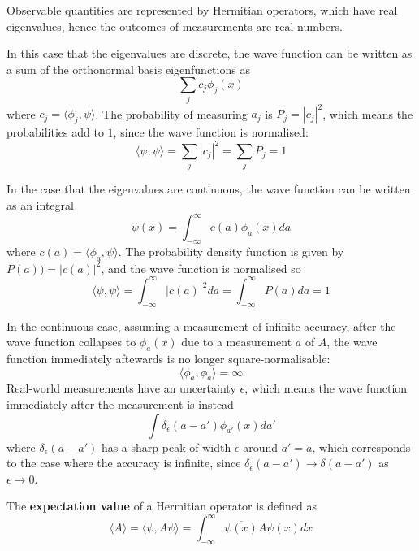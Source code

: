 \begin{corollary}
	Observable quantities are represented by Hermitian operators, which have real eigenvalues, hence the outcomes of measurements are real numbers.
\end{corollary}

\begin{remark}
	In this case that the eigenvalues are discrete, the wave function can be written as a sum of the orthonormal basis eigenfunctions as
	\[
		\sum_j c_j \phi_j(x)
	\]
	where $c_j = \langle \phi_j, \psi \rangle$. The probability of measuring $a_j$ is $P_j = |c_j|^2$, which means the probabilities add to $1$, since the wave function is normalised:
	\[
		\langle \psi, \psi \rangle = \sum_j |c_j|^2 = \sum_j P_j = 1
	\]
\end{remark}

\begin{remark}
	In the case that the eigenvalues are continuous, the wave function can be written as an integral
	\[
		\psi(x) = \int_{-\infty}^{\infty} c(a) \phi_a(x) da
	\]
	where $c(a) = \langle \phi_a, \psi \rangle$. The probability density function is given by $P(a)) = |c(a)|^2$, and the wave function is normalised so
	\[
		\langle \psi, \psi \rangle = \int_{-\infty}^{\infty} |c(a)|^2 da = \int_{-\infty}^{\infty} P(a) da = 1
	\]
\end{remark}

\begin{remark}
	In the continuous case, assuming a measurement of infinite accuracy, after the wave function collapses to $\phi_a(x)$ due to a measurement $a$ of $A$, the wave function immediately aftewards is no longer square-normalisable:
	\[
		\langle \phi_a, \phi_a \rangle = \infty
	\]
	Real-world measurements have an uncertainty $\epsilon$, which means the wave function immediately after the measurement is instead
	\[
		\int \delta_{\epsilon} (a - a') \phi_{a'}(x) da'
	\]
	where $\delta_{\epsilon}(a - a')$ has a sharp peak of width $\epsilon$ around $a' = a$, which corresponds to the case where the accuracy is infinite, since $\delta_{\epsilon}(a - a') \to \delta(a - a')$ as $\epsilon \to 0$.
\end{remark}

\begin{definition}
	The \textbf{expectation value} of a Hermitian operator is defined as
	\[
		\langle A \rangle = \langle \psi, A \psi \rangle = \int_{-\infty}^{\infty} \overline{\psi(x)} A \psi(x) dx
	\]
\end{definition}

